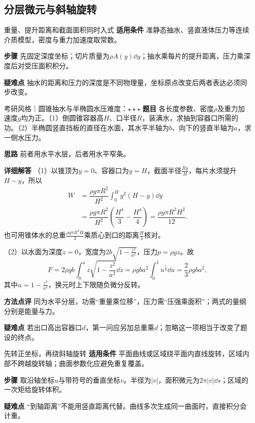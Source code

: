\subsection{分层微元与斜轴旋转}\label{ci:geometry}
\begin{method}{重量、提升距离和截面面积同时入式}
\textbf{适用条件} 准静态抽水、竖直液体压力等连续介质模型，密度与重力加速度取常数。\par
\textbf{步骤} 先固定深度坐标；切片质量为$\rho A(y)\dd y$；抽水乘每片的提升距离，压力乘深度后对受压面积积分。\par
\textbf{疑难点} 抽水的距离和压力的深度是不同物理量，坐标原点改变后两者表达必须同步改变。
\end{method}
\begin{example}{考研风格｜圆锥抽水与半椭圆水压}{难度：$\star\star\star$}\label{ci:ex:water}
\textbf{题目} 各长度参数、密度$\rho$及重力加速度$g$均为正。（1）倒圆锥容器高$H$、口半径$R$，装满水，求抽到容器口所需的功。（2）半椭圆竖直挡板的直径在水面，其水平半轴为$b$、向下的竖直半轴为$a$，求一侧水压力。\par
\textbf{思路} 前者用水平水层，后者用水平窄条。\par
\textbf{详细解答} （1）以锥顶为$y=0$、容器口为$y=H$，截面半径$\frac{Ry}{H}$，每片水须提升$H-y$，所以
\begin{align*}
 W&=\dfrac{\rho g\pi R^2}{H^2}\int_0^Hy^2(H-y)\dd y\\
 &=\dfrac{\rho g\pi R^2}{H^2}
 \left(\dfrac{H^4}3-\dfrac{H^4}4\right)
 =\dfrac{\rho g\pi R^2H^2}{12}.
\end{align*}
也可用锥体水的总重$\frac{\rho g\pi R^2H}{3}$乘质心到口的距离$\frac{H}{4}$核对。\par
（2）以水面为深度$z=0$，宽度为$2b\sqrt{1-\frac{z^2}{a^2}}$，压力$p=\rho gz$。故
\[
 F=2\rho gb\int_0^az\sqrt{1-\frac{z^2}{a^2}}\dd z
 =\rho gba^2\int_0^1u^{\frac{1}{2}}\dd u
 =\dfrac23\rho gba^2,
\]
其中$u=1-\frac{z^2}{a^2}$，换元时上下限随负微分反转。\par
\textbf{方法点评} 同为水平分层，功需“重量乘位移”，压力需“压强乘面积”；两式的量纲分别是能量与力。\par
\textbf{疑难点} 若出口高出容器口$d$，第一问应另加总重乘$d$；忽略这一项相当于改变了题设的终点。
\end{example}
\begin{method}{先转正坐标，再绕斜轴旋转}
\textbf{适用条件} 平面曲线或区域绕平面内直线旋转，区域内部不跨越旋转轴；曲面参数化应避免重复覆盖。\par
\textbf{步骤} 取沿轴坐标$u$与带符号的垂直坐标$v$。半径为$|v|$，面积微元为$2\pi|v|\dd s$；区域的一次矩给旋转体积。\par
\textbf{疑难点} “到轴距离”不能用竖直距离代替。曲线多次生成同一曲面时，直接积分会计重。
\end{method}
